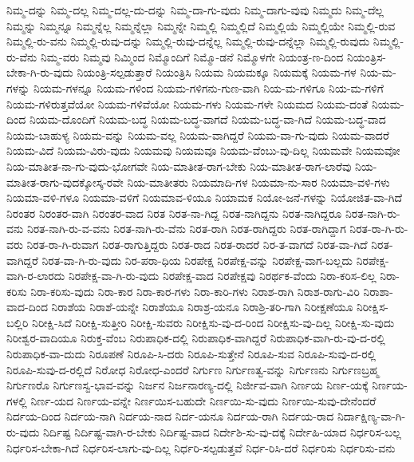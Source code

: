 {ನಿಮ್ಮ-ದನ್ನು
ನಿಮ್ಮ-ದಲ್ಲ
ನಿಮ್ಮ-ದಲ್ಲ-ದು-ದನ್ನು
ನಿಮ್ಮ-ದಾ-ಗು-ವುದು
ನಿಮ್ಮ-ದಾಗು-ವುವು
ನಿಮ್ಮದು
ನಿಮ್ಮ-ದೆಲ್ಲ
ನಿಮ್ಮನ್ನು
ನಿಮ್ಮನ್ನೂ
ನಿಮ್ಮನ್ನೆಲ್ಲ
ನಿಮ್ಮನ್ನೆಲ್ಲಾ
ನಿಮ್ಮನ್ನೇ
ನಿಮ್ಮಲ್ಲಿ
ನಿಮ್ಮಲ್ಲಿದೆ
ನಿಮ್ಮಲ್ಲಿಯೆ
ನಿಮ್ಮಲ್ಲಿಯೇ
ನಿಮ್ಮಲ್ಲಿ-ರುವ
ನಿಮ್ಮಲ್ಲಿ-ರು-ವನು
ನಿಮ್ಮಲ್ಲಿ-ರುವು-ದನ್ನು
ನಿಮ್ಮಲ್ಲಿ-ರುವು-ದನ್ನೆಲ್ಲ
ನಿಮ್ಮಲ್ಲಿ-ರುವು-ದನ್ನೆಲ್ಲಾ
ನಿಮ್ಮಲ್ಲಿ-ರುವುದು
ನಿಮ್ಮಲ್ಲಿ-ರು-ವೆನು
ನಿಮ್ಮ-ವರು
ನಿಮ್ಮವು
ನಿಮ್ಮಿಂದ
ನಿಮ್ಮೊಂದಿಗೆ
ನಿಮ್ಮೊ-ಡನೆ
ನಿಮ್ಮೊಳಗೇ
ನಿಯಂತ್ರ-ಣ-ದಿಂದ
ನಿಯಂತ್ರಿಸ-ಬೇಕಾ-ಗಿ-ರು-ವುದು
ನಿಯಂತ್ರಿ-ಸಲ್ಪಡುತ್ತಾರೆ
ನಿಯಂತ್ರಿಸಿ
ನಿಯಮ
ನಿಯಮಕ್ಕೂ
ನಿಯಮಕ್ಕೆ
ನಿಯಮ-ಗಳ
ನಿಯ-ಮ-ಗಳನ್ನು
ನಿಯಮ-ಗಳನ್ನೂ
ನಿಯಮ-ಗಳಿಂದ
ನಿಯಮ-ಗಳಿಗನು-ಗುಣ-ವಾಗಿ
ನಿಯ-ಮ-ಗಳಿಗೂ
ನಿಯ-ಮ-ಗಳಿಗೆ
ನಿಯಮ-ಗಳಿರುತ್ತವೆಯೋ
ನಿಯಮ-ಗಳಿವೆಯೋ
ನಿಯಮ-ಗಳು
ನಿಯಮ-ಗಳೇ
ನಿಯಮದ
ನಿಯಮ-ದಂತೆ
ನಿಯಮ-ದಿಂದ
ನಿಯಮ-ದೊಂದಿಗೆ
ನಿಯಮ-ಬದ್ಧ
ನಿಯಮ-ಬದ್ಧ-ವಾಗದೆ
ನಿಯಮ-ಬದ್ಧ-ವಾ-ಗಿದೆ
ನಿಯಮ-ಬದ್ಧ-ವಾದ
ನಿಯಮ-ಬಾಹುಳ್ಯ
ನಿಯಮ-ವನ್ನು
ನಿಯಮ-ವಲ್ಲ
ನಿಯಮ-ವಾಗಿದ್ದರೆ
ನಿಯಮ-ವಾ-ಗು-ವುದು
ನಿಯಮ-ವಾದರೆ
ನಿಯಮ-ವಿದೆ
ನಿಯಮ-ವಿರು-ವುದು
ನಿಯಮವು
ನಿಯಮವೂ
ನಿಯಮ-ವೆಂಬು-ವು-ದಿಲ್ಲ
ನಿಯಮವೇ
ನಿಯಮವೋ
ನಿಯ-ಮಾತೀತ-ನಾ-ಗು-ವುದು-ಭೋಗವೇ
ನಿಯ-ಮಾತೀತ-ರಾಗ-ಬೇಕು
ನಿಯ-ಮಾತೀತ-ರಾಗ-ಲಾರೆವು
ನಿಯ-ಮಾತೀತ-ರಾಗು-ವುದಕ್ಕೋಸ್ಕ-ರವೇ
ನಿಯ-ಮಾತೀತರು
ನಿಯಮಾದಿ-ಗಳ
ನಿಯಮಾ-ನು-ಸಾರ
ನಿಯಮಾ-ವಳಿ-ಗಳು
ನಿಯಮಾ-ವಳಿ-ಗಳೂ
ನಿಯಮಾ-ವಳಿಗೆ
ನಿಯಮಾವ-ಳಿಯೂ
ನಿಯಾಮಕ
ನಿಯೋ-ಜನೆ-ಗಳನ್ನು
ನಿಯೋಜಿತ-ವಾ-ಗಿದೆ
ನಿರಂತರ
ನಿರಂತರ-ವಾಗಿ
ನಿರಂತರ-ವಾದ
ನಿರತ
ನಿರತ-ನಾ-ಗಿದ್ದ
ನಿರತ-ನಾಗಿದ್ದನು
ನಿರತ-ನಾಗಿದ್ದರೂ
ನಿರತ-ನಾಗಿ-ರು-ವನು
ನಿರತ-ನಾಗಿ-ರು-ವ-ವನು
ನಿರತ-ನಾಗಿ-ರು-ವೆನು
ನಿರತ-ರಾಗಿ
ನಿರತ-ರಾಗಿದ್ದರು
ನಿರತ-ರಾಗಿದ್ದಾಗ
ನಿರತ-ರಾ-ಗಿ-ರು-ವರು
ನಿರತ-ರಾ-ಗಿ-ರುವಾಗ
ನಿರತ-ರಾಗುತ್ತಿದ್ದರು
ನಿರತ-ರಾದ
ನಿರತ-ರಾದರೆ
ನಿರ-ತ-ವಾಗದೆ
ನಿರತ-ವಾ-ಗಿದೆ
ನಿರತ-ವಾಗಿದ್ದರೆ
ನಿರತ-ವಾ-ಗಿ-ರು-ವುದು
ನಿರ-ಪರಾ-ಧಿಯ
ನಿರಪೇಕ್ಷ
ನಿರಪೇಕ್ಷ-ವನ್ನು
ನಿರಪೇಕ್ಷ-ವಾಗ-ಬಲ್ಲದು
ನಿರಪೇಕ್ಷ-ವಾಗಿ-ರ-ಲಾರದು
ನಿರಪೇಕ್ಷ-ವಾ-ಗಿ-ರು-ವುದು
ನಿರಪೇಕ್ಷ-ವಾದ
ನಿರಪೇಕ್ಷವು
ನಿರರ್ಥಕ-ವೆಂದು
ನಿರಾ-ಕರಿಸ-ಲಿಲ್ಲ
ನಿರಾ-ಕರಿಸು
ನಿರಾ-ಕರಿಸು-ವುದು
ನಿರಾ-ಕಾರ
ನಿರಾ-ಕಾರ-ಗಳು
ನಿರಾ-ಕಾರಿ-ಗಳು
ನಿರಾಶ-ರಾಗಿ
ನಿರಾಶ-ರಾಗು-ವಿರಿ
ನಿರಾಶಾ-ವಾದ-ದಿಂದ
ನಿರಾಶೆಯ
ನಿರಾಶೆ-ಯನ್ನೇ
ನಿರಾಶೆಯೂ
ನಿರಾಶ್ರ-ಯನೂ
ನಿರಾಶ್ರಿ-ತರಿ-ಗಾಗಿ
ನಿರೀಕ್ಷಣೆಯೂ
ನಿರೀಕ್ಷಿಸ-ಬಲ್ಲಿರಿ
ನಿರೀಕ್ಷಿ-ಸಿದೆ
ನಿರೀಕ್ಷಿ-ಸುತ್ತೀರಿ
ನಿರೀಕ್ಷಿ-ಸುವರು
ನಿರೀಕ್ಷಿಸು-ವು-ದ-ರಿಂದ
ನಿರೀಕ್ಷಿಸು-ವು-ದಿಲ್ಲ
ನಿರೀಕ್ಷಿ-ಸು-ವುದು
ನಿರೀಶ್ವರ-ವಾದಿಯೂ
ನಿರುಕ್ತ-ವೆಂಬ
ನಿರುಪಾಧಿಕ-ದಲ್ಲಿ
ನಿರುಪಾಧಿಕ-ವಾಗಿದ್ದರೆ
ನಿರುಪಾಧಿಕ-ವಾಗಿ-ರು-ವು-ದ-ರಲ್ಲಿ
ನಿರುಪಾಧಿಕ-ವಾ-ದುದು
ನಿರೂಪಣೆ
ನಿರೂಪಿ-ಸಿ-ದರು
ನಿರೂಪಿ-ಸುತ್ತೇನೆ
ನಿರೂಪಿ-ಸುವ
ನಿರೂಪಿ-ಸುವು-ದ-ರಲ್ಲಿ
ನಿರೂಪಿ-ಸುವು-ದ-ರಲ್ಲಿದೆ
ನಿರೋಧ
ನಿರೋಧ-ಎಂದರೆ
ನಿರ್ಗುಣ
ನಿರ್ಗುಣತ್ವ-ವನ್ನು
ನಿರ್ಗುಣನು
ನಿರ್ಗುಣಬ್ರಹ್ಮ
ನಿರ್ಗುಣರೊ
ನಿರ್ಗುಣಸ್ವ-ಭಾವ-ವನ್ನು
ನಿರ್ಜನ
ನಿರ್ಜನಾರಣ್ಯ-ದಲ್ಲಿ
ನಿರ್ಜೀವ-ವಾಗಿ
ನಿರ್ಣಯ
ನಿರ್ಣ-ಯಕ್ಕೆ
ನಿರ್ಣಯ-ಗಳಲ್ಲಿ
ನಿರ್ಣ-ಯದ
ನಿರ್ಣಯ-ವನ್ನೇ
ನಿರ್ಣಯಿಸ-ಬಹುದೇ
ನಿರ್ಣಯಿ-ಸು-ವುದು
ನಿರ್ಣಯಿ-ಸುವು-ದೇನೆಂದರೆ
ನಿರ್ದಯ-ದಿಂದ
ನಿರ್ದಯ-ನಾಗಿ
ನಿರ್ದಯ-ನಾದ
ನಿರ್ದ-ಯನೂ
ನಿರ್ದಯ-ರಾಗಿ
ನಿರ್ದಯ-ರಾದ
ನಿರ್ದಾಕ್ಷಿಣ್ಯ-ವಾ-ಗಿ-ರು-ವುದು
ನಿರ್ದಿಷ್ಟ
ನಿರ್ದಿಷ್ಟ-ವಾಗಿ-ರ-ಬೇಕು
ನಿರ್ದಿಷ್ಟ-ವಾದ
ನಿರ್ದೇಶಿ-ಸು-ವು-ದಕ್ಕೆ
ನಿರ್ದೇಹಿ-ಯಾದ
ನಿರ್ಧರಿಸ-ಬಲ್ಲ
ನಿರ್ಧರಿಸ-ಬೇಕಾ-ಗಿದೆ
ನಿರ್ಧರಿಸ-ಲಾಗು-ವು-ದಿಲ್ಲ
ನಿರ್ಧರಿ-ಸಲ್ಪಡುತ್ತವೆ
ನಿರ್ಧ-ರಿಸಿ-ದರೆ
ನಿರ್ಧರಿಸು
ನಿರ್ಧರಿಸು-ವನು
}

